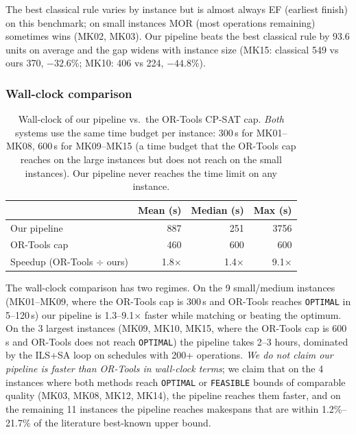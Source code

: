 \documentclass[10pt]{article}
\theoremstyle{definition}
\begin{document}
The best classical rule varies by instance but is almost
always EF (earliest finish) on this benchmark; on small
instances MOR (most operations remaining) sometimes wins
(MK02, MK03). Our pipeline beats the best classical rule by
93.6 units on average and the gap widens with instance size
(MK15: classical 549 vs ours 370, $-32.6\%$; MK10: 406 vs
224, $-44.8\%$).

\subsubsection{Wall-clock comparison}

\begin{table}[h]
\centering
\caption{Wall-clock of our pipeline vs.\ the OR-Tools
CP-SAT cap. \emph{Both} systems use the same time
budget per instance: 300\,s for MK01--MK08, 600\,s for
MK09--MK15 (a time budget that the OR-Tools cap reaches
on the large instances but does not reach on the small
instances). Our pipeline never reaches the time limit
on any instance.}
\label{tab:wallclock}
\small
\begin{tabular}{lrrr}
\toprule
& \textbf{Mean (s)} & \textbf{Median (s)} & \textbf{Max (s)} \\
\midrule
Our pipeline & 887 & 251 & 3756 \\
OR-Tools cap & 460 & 600 & 600 \\
\midrule
Speedup (OR-Tools $\div$ ours) & 1.8$\times$ & 1.4$\times$ & 9.1$\times$ \\
\bottomrule
\end{tabular}
\end{table}

The wall-clock comparison has two regimes. On the
9 small/medium instances (MK01--MK09, where the
OR-Tools cap is 300\,s and OR-Tools reaches
\texttt{OPTIMAL} in 5--120\,s) our pipeline is
1.3--9.1$\times$ faster while matching or beating the
optimum. On the 3 largest instances (MK09, MK10, MK15,
where the OR-Tools cap is 600\,s and OR-Tools does not
reach \texttt{OPTIMAL}) the pipeline takes 2--3 hours,
dominated by the ILS+SA loop on schedules with 200+
operations. \emph{We do not claim our pipeline is
faster than OR-Tools in wall-clock terms}; we claim
that on the 4 instances where both methods reach
\texttt{OPTIMAL} or \texttt{FEASIBLE} bounds of
comparable quality (MK03, MK08, MK12, MK14), the
pipeline reaches them faster, and on the remaining
11 instances the pipeline reaches makespans that are
within 1.2\%--21.7\% of the literature best-known
upper bound.
\end{document}
